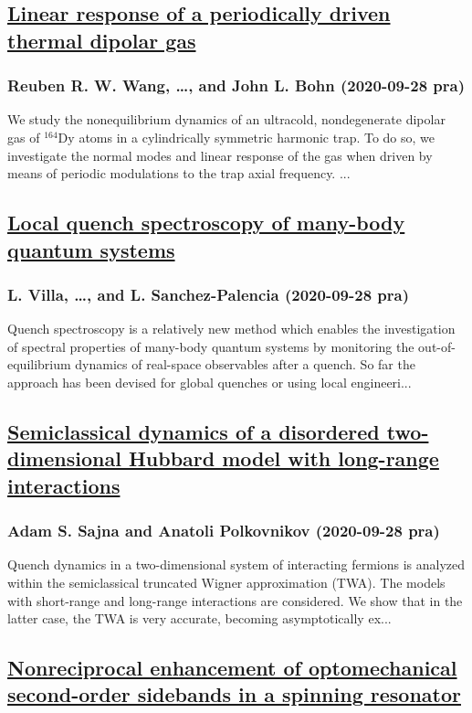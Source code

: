 \subsection*{\href{http://link.aps.org/doi/10.1103/PhysRevA.102.033336}{Linear response of a periodically driven thermal dipolar gas}}
\subsubsection*{Reuben R. W. Wang, \dots, and John L. Bohn (2020-09-28 pra)}
We study the nonequilibrium dynamics of an ultracold, nondegenerate dipolar gas of $^{164}\mathrm{Dy}$ atoms in a cylindrically symmetric harmonic trap. To do so, we investigate the normal modes and linear response of the gas when driven by means of periodic modulations to the trap axial frequency. ...
\subsection*{\href{http://link.aps.org/doi/10.1103/PhysRevA.102.033337}{Local quench spectroscopy of many-body quantum systems}}
\subsubsection*{L. Villa, \dots, and L. Sanchez-Palencia (2020-09-28 pra)}
Quench spectroscopy is a relatively new method which enables the investigation of spectral properties of many-body quantum systems by monitoring the out-of-equilibrium dynamics of real-space observables after a quench. So far the approach has been devised for global quenches or using local engineeri...
\subsection*{\href{http://link.aps.org/doi/10.1103/PhysRevA.102.033338}{Semiclassical dynamics of a disordered two-dimensional Hubbard model with long-range interactions}}
\subsubsection*{Adam S. Sajna and Anatoli Polkovnikov (2020-09-28 pra)}
Quench dynamics in a two-dimensional system of interacting fermions is analyzed within the semiclassical truncated Wigner approximation (TWA). The models with short-range and long-range interactions are considered. We show that in the latter case, the TWA is very accurate, becoming asymptotically ex...
\subsection*{\href{http://link.aps.org/doi/10.1103/PhysRevA.102.033526}{Nonreciprocal enhancement of optomechanical second-order sidebands in a spinning resonator}}
